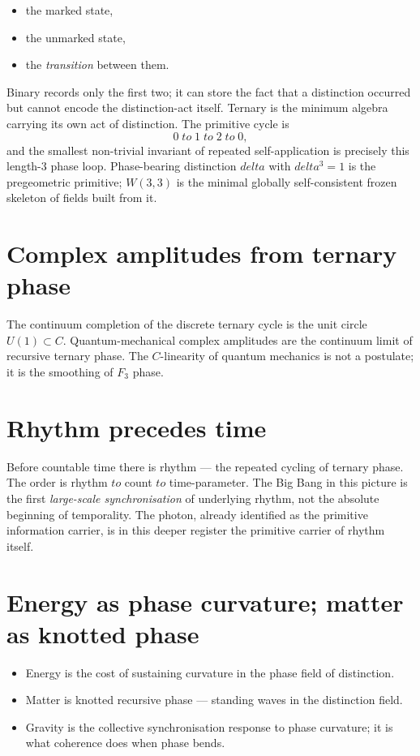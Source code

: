 \documentclass[11pt]{article}
\def\mathbb#1{#1}%
\def\textbf#1{#1}%
\def\delta{delta}%
\def\to{ to }%
\begin{document}
\begin{itemize}[leftmargin=2em]
\item the marked state,
\item the unmarked state,
\item the \emph{transition} between them.
\end{itemize}

Binary records only the first two; it can store the fact that a distinction occurred but cannot encode the distinction-act itself. \textbf{Ternary is the minimum algebra carrying its own act of distinction.} The primitive cycle is
\[
0 \;\to\; 1 \;\to\; 2 \;\to\; 0,
\]
and the smallest non-trivial invariant of repeated self-application is precisely this length-$3$ phase loop. Phase-bearing distinction $\delta$ with $\delta^3 = 1$ is the pregeometric primitive; $W(3,3)$ is the minimal globally self-consistent frozen skeleton of fields built from it.

\section{Complex amplitudes from ternary phase}

The continuum completion of the discrete ternary cycle is the unit circle $U(1) \subset \mathbb{C}$. \textbf{Quantum-mechanical complex amplitudes are the continuum limit of recursive ternary phase.} The $\mathbb{C}$-linearity of quantum mechanics is not a postulate; it is the smoothing of $\mathbb{F}_3$ phase.

\section{Rhythm precedes time}

Before countable time there is rhythm --- the repeated cycling of ternary phase. The order is rhythm $\to$ count $\to$ time-parameter. The Big Bang in this picture is the first \emph{large-scale synchronisation} of underlying rhythm, not the absolute beginning of temporality. The photon, already identified as the primitive information carrier, is in this deeper register the primitive carrier of rhythm itself.

\section{Energy as phase curvature; matter as knotted phase}

\begin{itemize}[leftmargin=2em]
\item Energy is the cost of sustaining curvature in the phase field of distinction.
\item Matter is knotted recursive phase --- standing waves in the distinction field.
\item Gravity is the collective synchronisation response to phase curvature; it is what coherence does when phase bends.
\end{itemize}
\end{document}
